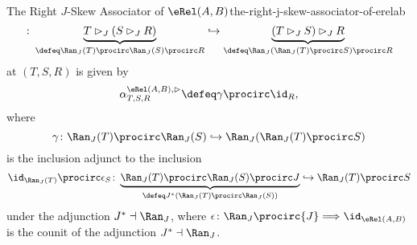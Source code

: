 \begin{definition}{The Right $J$-Skew Associator of $\eRel(A,B)$}{the-right-j-skew-associator-of-erelab}
\[        \colon%
        \underbrace{T\rhd_{J}(S\rhd_{J}R)}_{\defeq\Ran_{J}(T)\procirc\Ran_{J}(S)\procirc R}%
        \hookrightarrow
        \underbrace{(T\rhd_{J}S)\rhd_{J}R}_{\defeq\Ran_{J}(\Ran_{J}(T)\procirc S)\procirc R}%
    \]%
    at $(T,S,R)$ is given by
    \[
        \alpha^{\eRel(A,B),\rhd}_{T,S,R}%
        \defeq%
        \gamma\procirc\id_{R},
    \]%
    where
    \[%
        \gamma%
        \colon%
        \Ran_{J}(T)\procirc\Ran_{J}(S)
        \hookrightarrow
        \Ran_{J}(\Ran_{J}(T)\procirc S)
    \]%
    is the inclusion adjunct to the inclusion
    \[
        \id_{\Ran_{J}(T)}\procirc\epsilon_{S}%
        \colon%
        \underbrace{\Ran_{J}(T)\procirc\Ran_{J}(S)\procirc J}_{\defeq J^{*}(\Ran_{J}(T)\procirc\Ran_{J}(S))}%
        \hookrightarrow
        \Ran_{J}(T)\procirc S%
    \]%
    under the adjunction $J^{*}\dashv\Ran_{J}$, where $\epsilon\colon{\Ran_{J}}\procirc{J}\Longrightarrow\id_{\eRel(A,B)}$ is the counit of the adjunction $J^{*}\dashv\Ran_{J}$.
\end{definition}

